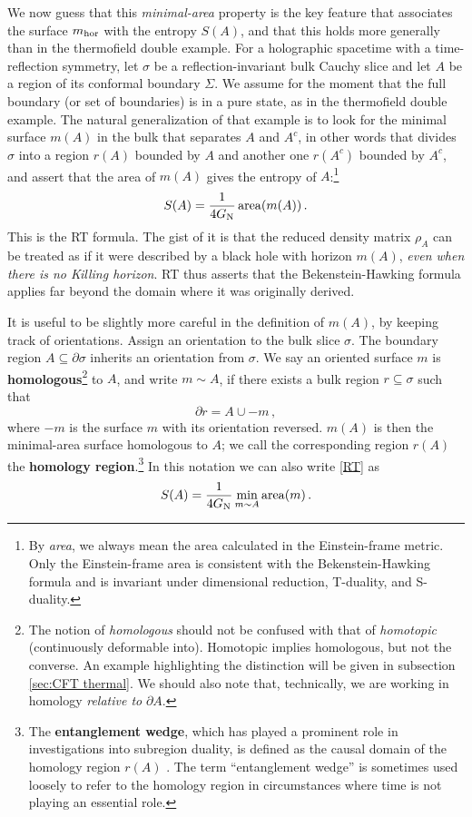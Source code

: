 \documentclass[11pt]{article}
\newcommand{\GN}{G_{\rm N}}
\DeclareMathOperator{\area}{area}
\begin{document}
We now guess that this \emph{minimal-area} property is the key feature that associates the surface $m_{\rm hor}$ with the entropy $S(A)$, and that this holds more generally than in the thermofield double example. For a holographic spacetime with a time-reflection symmetry, let $\sigma$ be a reflection-invariant bulk Cauchy slice and let $A$ be a region of its conformal boundary $\Sigma$. We assume for the moment that the full boundary (or set of boundaries) is in a pure state, as in the thermofield double example. The natural generalization of that example is to look for the minimal surface $m(A)$ in the bulk that separates $A$ and $A^c$, in other words that divides $\sigma$ into a region $r(A)$ bounded by $A$ and another one $r(A^c)$ bounded by $A^c$, and assert that the area of $m(A)$ gives the entropy of $A$:\footnote{By \emph{area}, we always mean the area calculated in the Einstein-frame metric. Only the Einstein-frame area is consistent with the Bekenstein-Hawking formula and is invariant under dimensional reduction, T-duality, and S-duality.} 
\begin{equation}\label{RT}
S(A) = \frac1{4\GN}\area(m(A))\,.
\end{equation}
This is the RT formula. The gist of it is that the reduced density matrix $\rho_A$ can be treated as if it were described by a black hole with horizon $m(A)$, \emph{even when there is no Killing horizon}. RT thus asserts that the Bekenstein-Hawking formula applies far beyond the domain where it was originally derived.

It is useful to be slightly more careful in the definition of $m(A)$, by keeping track of orientations. Assign an orientation to the bulk slice $\sigma$. The boundary region $A\subseteq\partial\sigma$ inherits an orientation from $\sigma$. We say an oriented surface $m$ is \textbf{homologous}\footnote{The notion of \emph{homologous} should not be confused with that of \emph{homotopic} (continuously deformable into). Homotopic implies homologous, but not the converse. An example highlighting the distinction will be given in subsection \ref{sec:CFT thermal}. We should also note that, technically, we are working in homology \emph{relative to} $\partial A$.} to $A$, and write $m\sim A$, if there exists a bulk region $r\subseteq\sigma$ such that
\begin{equation}
\partial r = A\cup-m\,,
\end{equation}
where $-m$ is the surface $m$ with its orientation reversed. $m(A)$ is then the minimal-area surface homologous to $A$; we call the corresponding region $r(A)$ the \textbf{homology region}.\footnote{The \textbf{entanglement wedge}, which has played a prominent role in investigations into subregion duality, is defined as the causal domain of the homology region $r(A)$ \cite{Headrick:2014cta}. The term ``entanglement wedge'' is sometimes used loosely to refer to the homology region in circumstances where time is not playing an essential role.} In this notation we can also write \eqref{RT} as
\begin{equation}\label{RT2}
S(A) = \frac1{4\GN}\min_{m\sim A}\area(m)\,.
\end{equation}
\end{document}
